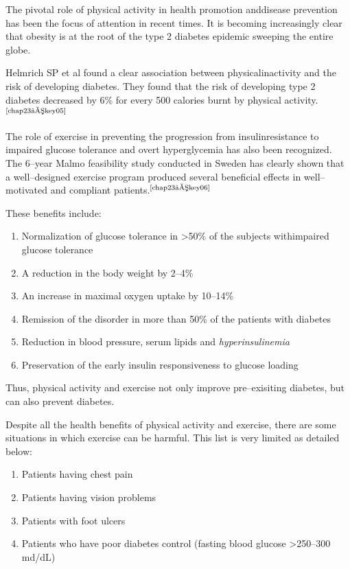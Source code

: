 
\vskip 8pt

The pivotal role of physical activity in health promotion and\break disease prevention has been the focus of attention in recent times. It is becoming increasingly clear that obesity is at the root of the type 2 diabetes epidemic sweeping the entire globe.

Helmrich SP et al found a clear association between physical\break inactivity and the risk of developing diabetes. They found that the risk of developing type 2 diabetes decreased by 6\% for every 500 calories burnt by physical activity.$^{\text{\cite{chap23–key05}}}$

The role of exercise in preventing the progression from insulin\break resistance to impaired glucose tolerance and overt hyperglycemia has also been recognized. The 6–year Malmo feasibility study conducted in Sweden has clearly shown that a well–designed exercise program produced several beneficial effects in well–motivated and compliant patients.$^{\text{\cite{chap23–key06}}}$

\vskip 6pt

\noindent These benefits include:
\begin{enumerate}[•]
\itemsep=0pt
\item Normalization of glucose tolerance in \textgreater  50\% of the subjects with\break impaired glucose tolerance
\item A reduction in the body weight by 2–4\%
\item An increase in maximal oxygen uptake by 10–14\%
\item Remission of the disorder in more than 50\% of the patients with diabetes
\item Reduction in blood pressure, serum lipids and \textit{hyperinsulinemia}
\item Preservation of the early insulin responsiveness to glucose loading
\end{enumerate}

Thus, physical activity and exercise not only improve pre–exisiting diabetes, but can also prevent diabetes.

\clearpage
{}

Despite all the health benefits of physical activity and exercise, there are some situations in which exercise can be harmful. This list is very limited as detailed below:
\begin{enumerate}[•]
\itemsep=0pt
\item Patients having chest pain
\item Patients having vision problems
\item Patients with foot ulcers
\item Patients who have poor diabetes control (fasting blood glucose \textgreater  250–300 md/dL)
\end{enumerate}

